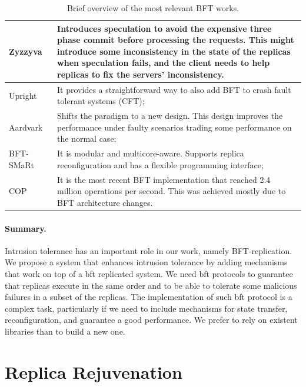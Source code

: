 \begin{table}[!t]
\begin{center}
{\footnotesize
\begin{tabular}{ p{2.5cm}  p{11cm}  }\hline
Zyzzyva~\cite{Kotla:2010}  & Introduces speculation to avoid the expensive three phase commit before processing the requests. This might introduce some inconsistency in the state of the replicas when speculation fails, and the client needs to help replicas to fix the servers’ inconsistency. \\ \hline			
Upright~\cite{Clement:2009} & It provides a straightforward way to also add BFT to crash fault tolerant systems (CFT); \\ \hline	
Aardvark~\cite{Clement:2009b} & Shifts the paradigm to a new design. This design improves the performance under faulty scenarios trading some performance on the normal case; \\ \hline
BFT-SMaRt~\cite{Bessani:2014} & It is modular and multicore-aware. Supports replica reconfiguration and has a flexible programming interface; \\ \hline
COP~\cite{Behl:2015} & It is the most recent BFT implementation that reached 2.4 million operations per second. This was achieved mostly due to BFT architecture changes.\\  \hline  
\end{tabular}
}
\caption{Brief overview of the most relevant BFT works.}
\label{tab:bft}
\end{center}
\end{table}

\paragraph{Summary.} 
Intrusion tolerance has an important role in our work, namely BFT-replication.
We propose a system that enhances intrusion tolerance by adding mechanisms that work on
top of a \gls{bft} replicated system. We need \gls{bft} protocols to guarantee that replicas execute in
the same order and to be able to tolerate some malicious failures in a subset of the replicas.
The implementation of such \gls{bft} protocol is a complex task, particularly if we need to
include mechanisms for state transfer, reconfiguration, and guarantee a good performance.
We prefer to rely on existent libraries than to build a new one.



\section{Replica Rejuvenation}


